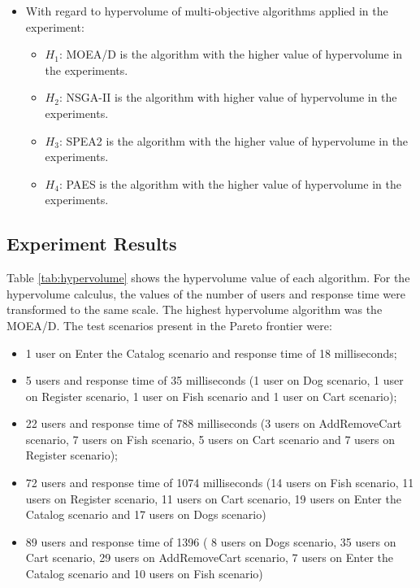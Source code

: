 \documentclass[espaco=umemeio,chapter=TITLE,twoside,openright]{abnt}
\begin{document}
\begin{itemize}
\item With regard to hypervolume of multi-objective algorithms applied in the experiment:
\begin{itemize}
\item $H_{1}$: MOEA/D is the algorithm with the higher value of hypervolume in the experiments.
\item $H_{2}$: NSGA-II is the algorithm with higher value of hypervolume in the experiments.
\item $H_{3}$: SPEA2 is the algorithm with the higher value of hypervolume in the experiments.
\item $H_{4}$: PAES is the algorithm with the higher value of hypervolume in the experiments.
\end{itemize}
\end{itemize}


\subsection{Experiment Results}

Table \ref{tab:hypervolume} shows the hypervolume value of each algorithm. For the hypervolume calculus, the values of the number of users and response time were transformed to the same scale. The highest hypervolume algorithm was the MOEA/D. The test scenarios present in the Pareto frontier were:

\begin{itemize}
\item 1 user on Enter the Catalog scenario and response time of 18 milliseconds;
\item 5 users and response time of 35 milliseconds (1 user on Dog scenario, 1 user on Register scenario, 1 user on Fish scenario and 1 user on Cart scenario);
\item 22 users and response time of 788 milliseconds (3 users on AddRemoveCart scenario, 7 users on Fish scenario, 5 users on Cart scenario and 7 users on Register scenario);
\item 72 users and response time of 1074 milliseconds (14 users on Fish scenario, 11 users on Register scenario, 11 users on Cart scenario, 19 users on Enter the Catalog scenario and 17 users on Dogs scenario)
\item 89 users and response time of 1396 ( 8 users on Dogs scenario, 35 users on Cart scenario, 29 users on AddRemoveCart scenario, 7 users on Enter the Catalog scenario and 10 users on Fish scenario)

\end{itemize}
\end{document}
